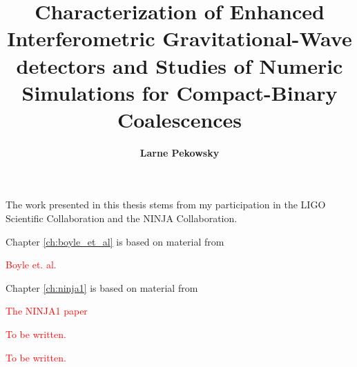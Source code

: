 \documentclass[12pt,notitlepage]{report}
\newcommand\fake[1]{\textcolor{red}{#1}}
\begin{document}
\title{
Characterization of Enhanced Interferometric Gravitational-Wave
detectors and Studies of Numeric Simulations for Compact-Binary
Coalescences
}
\author{\bf Larne Pekowsky}
\havededicationtrue
\dedication{to\\ my parents}
\haveminorfalse
\copyrighttrue
\doctoratetrue
\figurespagetrue
\tablespagetrue


\beforepreface
{}
The work presented in this thesis stems from my participation in the LIGO
Scientific Collaboration and the NINJA Collaboration.


\vspace*{0.5cm}

\noindent Chapter \ref{ch:boyle_et_al} is based on material from

\vspace*{0.25cm}

\noindent \fake{Boyle et. al.}


\vspace*{0.5cm}

\noindent Chapter \ref{ch:ninja1} is based on material from

\vspace*{0.25cm}

\noindent \fake{The NINJA1 paper}




\fake{To be written.}

\fake{To be written.}

\afterpreface

\label{ch:introduction}

\label{ch:theory}


\label{ch:modeling}


\label{ch:search}


\label{ch:comparison}


\label{ch:ninja1}


\label{ch:ninja2}


\label{ch:ninja2_results}


\label{ch:segdb}


\label{ch:detchar}





\clearpage


\end{document}
